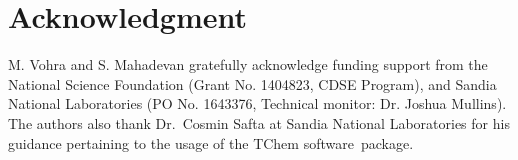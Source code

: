 \section*{Acknowledgment}

M. Vohra and S. Mahadevan gratefully acknowledge funding support from the
National Science Foundation (Grant No. 1404823, CDSE Program), and Sandia
National Laboratories (PO No. 1643376, Technical monitor: Dr. Joshua Mullins).
The authors also thank Dr.~Cosmin Safta at Sandia National
Laboratories for his guidance pertaining to the usage of the TChem software\
package.

